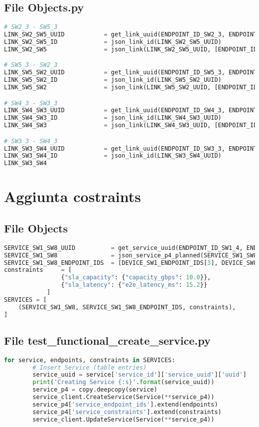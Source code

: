 \subsection{File Objects.py}
\begin{lstlisting}[language=Python]
# SW2_3 - SW5_3
LINK_SW2_SW5_UUID           = get_link_uuid(ENDPOINT_ID_SW2_3, ENDPOINT_ID_SW5_3)
LINK_SW2_SW5_ID             = json_link_id(LINK_SW2_SW5_UUID)
LINK_SW2_SW5                = json_link(LINK_SW2_SW5_UUID, [ENDPOINT_ID_SW2_3, ENDPOINT_ID_SW5_3])

# SW5_3 - SW2_3
LINK_SW5_SW2_UUID           = get_link_uuid(ENDPOINT_ID_SW5_3, ENDPOINT_ID_SW2_3)
LINK_SW5_SW2_ID             = json_link_id(LINK_SW5_SW2_UUID)
LINK_SW5_SW2                = json_link(LINK_SW5_SW2_UUID, [ENDPOINT_ID_SW5_3, ENDPOINT_ID_SW2_3])

# SW4_3 - SW3_3
LINK_SW4_SW3_UUID           = get_link_uuid(ENDPOINT_ID_SW4_3, ENDPOINT_ID_SW3_3)
LINK_SW4_SW3_ID             = json_link_id(LINK_SW4_SW3_UUID)
LINK_SW4_SW3                = json_link(LINK_SW4_SW3_UUID, [ENDPOINT_ID_SW4_3, ENDPOINT_ID_SW3_3])

# SW3_3 - SW4_3
LINK_SW3_SW4_UUID           = get_link_uuid(ENDPOINT_ID_SW3_3, ENDPOINT_ID_SW4_3)
LINK_SW3_SW4_ID             = json_link_id(LINK_SW3_SW4_UUID)
LINK_SW3_SW4 
\end{lstlisting}

\section{Aggiunta costraints}
\subsection{File Objects}
\label{cap:obj}
\begin{lstlisting}[language=Python]
SERVICE_SW1_SW8_UUID          = get_service_uuid(ENDPOINT_ID_SW1_4, ENDPOINT_ID_SW8_4)
SERVICE_SW1_SW8               = json_service_p4_planned(SERVICE_SW1_SW8_UUID)
SERVICE_SW1_SW8_ENDPOINT_IDS  = [DEVICE_SW1_ENDPOINT_IDS[3], DEVICE_SW8_ENDPOINT_IDS[3]]
constraints     = [
                {"sla_capacity": {"capacity_gbps": 10.0}},
                {"sla_latency": {"e2e_latency_ms": 15.2}}
            ]
SERVICES = [
    (SERVICE_SW1_SW8, SERVICE_SW1_SW8_ENDPOINT_IDS, constraints),
]
\end{lstlisting}
\subsection{File test\_functional\_create\_service.py}
\begin{lstlisting}[language=Python]
    for service, endpoints, constraints in SERVICES:
        # Insert Service (table entries)
        service_uuid = service['service_id']['service_uuid']['uuid']
        print('Creating Service {:s}'.format(service_uuid))
        service_p4 = copy.deepcopy(service)
        service_client.CreateService(Service(**service_p4))
        service_p4['service_endpoint_ids'].extend(endpoints)
        service_p4['service_constraints'].extend(constraints)
        service_client.UpdateService(Service(**service_p4))
\end{lstlisting}
